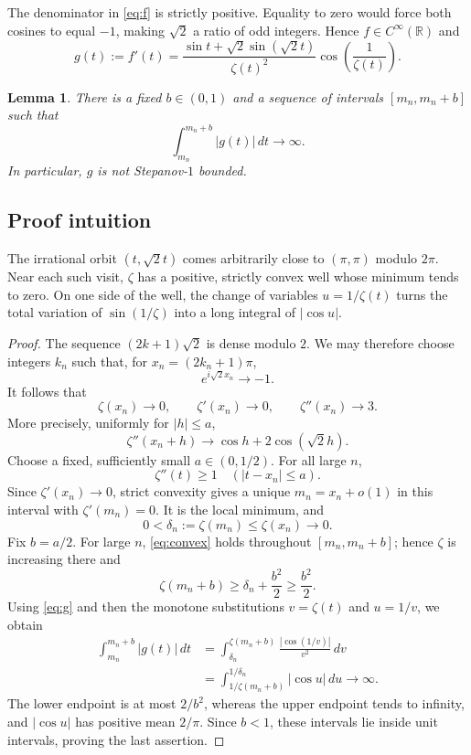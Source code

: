 \documentclass[11pt]{article}
\newtheorem{lemma}[theorem]{Lemma}
\newcommand{\R}{\mathbb R}
\begin{document}
The denominator in \eqref{eq:f} is strictly positive.  Equality to zero
would force both cosines to equal $-1$, making $\sqrt2$ a ratio of odd
integers.  Hence $f\in C^\infty(\R)$ and
\begin{equation}\label{eq:g}
 g(t):=f'(t)=
 \frac{\sin t+\sqrt2\sin(\sqrt2t)}{\zeta(t)^2}
 \cos\!\left(\frac1{\zeta(t)}\right).
\end{equation}

\begin{lemma}\label{lem:unbounded}
There is a fixed $b\in(0,1)$ and a sequence of intervals
$[m_n,m_n+b]$ such that
\[
             \int_{m_n}^{m_n+b}|g(t)|\,dt\longrightarrow\infty.
\]
In particular, $g$ is not Stepanov-$1$ bounded.
\end{lemma}

\subsection*{Proof intuition}

The irrational orbit $(t,\sqrt2t)$ comes arbitrarily close to
$(\pi,\pi)$ modulo $2\pi$.  Near each such visit, $\zeta$ has a positive,
strictly convex well whose minimum tends to zero.  On one side of the well,
the change of variables $u=1/\zeta(t)$ turns the total variation of
$\sin(1/\zeta)$ into a long integral of $|\cos u|$.

\begin{proof}
The sequence $(2k+1)\sqrt2$ is dense modulo $2$.  We may therefore choose
integers $k_n$ such that, for $x_n=(2k_n+1)\pi$,
\[
 e^{i\sqrt2x_n}\longrightarrow-1.
\]
It follows that
\[
 \zeta(x_n)\to0,\qquad \zeta'(x_n)\to0,\qquad
 \zeta''(x_n)\to3.
\]
More precisely, uniformly for $|h|\leq a$,
\[
 \zeta''(x_n+h)\longrightarrow \cos h+2\cos(\sqrt2h).
\]
Choose a fixed, sufficiently small $a\in(0,1/2)$.  For all large $n$,
\begin{equation}\label{eq:convex}
                  \zeta''(t)\geq1\quad(|t-x_n|\leq a).
\end{equation}
Since $\zeta'(x_n)\to0$, strict convexity gives a unique
$m_n=x_n+o(1)$ in this interval with $\zeta'(m_n)=0$.  It is the local
minimum, and
\[
       0<\delta_n:=\zeta(m_n)\leq\zeta(x_n)\longrightarrow0.
\]
Fix $b=a/2$.  For large $n$, \eqref{eq:convex} holds throughout
$[m_n,m_n+b]$; hence $\zeta$ is increasing there and
\[
              \zeta(m_n+b)\geq\delta_n+\frac{b^2}{2}
              \geq\frac{b^2}{2}.
\]
Using \eqref{eq:g} and then the monotone substitutions
$v=\zeta(t)$ and $u=1/v$, we obtain
\begin{align*}
 \int_{m_n}^{m_n+b}|g(t)|\,dt
 &=\int_{\delta_n}^{\zeta(m_n+b)}
       \frac{|\cos(1/v)|}{v^2}\,dv\\
 &=\int_{1/\zeta(m_n+b)}^{1/\delta_n}|\cos u|\,du
   \longrightarrow\infty.
\end{align*}
The lower endpoint is at most $2/b^2$, whereas the upper endpoint tends
to infinity, and $|\cos u|$ has positive mean $2/\pi$.  Since $b<1$,
these intervals lie inside unit intervals, proving the last assertion.
\end{proof}
\end{document}
